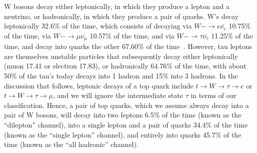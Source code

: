 W bosons decay either leptonically, in which they produce a lepton and a neutrino, or hadronically, in which they produce a pair of quarks.
W's decay leptonically 32.6\% of the time, which consists of decaying via $W- \rightarrow e \bar{\nu_{e}}$ 10.75\% of the time, 
via $W- \rightarrow \mu \bar{\nu_{\mu}}$ 10.57\% of the time, and via $W- \rightarrow \tau \bar{\nu_{\tau}}$ 11.25\% of the time, 
and decay into quarks the other 67.60\% of the time~\cite{PARTICLE_DATA_GROUP}.
However, tau leptons are themselves unstable particles that subsequently decay either leptonically (muon 17.41 or electron 17.83), or hadronically 64.76\% of the time, with about 50\% of the tau's today decays into 1 hadron and 15\% into 3 hadrons.
In the discussion that follows, leptonic decays of a top quark include $t \rightarrow W \rightarrow \tau \rightarrow e$ or $t \rightarrow W \rightarrow \tau \rightarrow \mu$, and we will ignore the intermediate state $\tau$ in terms of our classification.
Hence, a pair of top quarks, which we assume always decay into a pair of W bosons, will decay into two leptons 6.5\% of the time (known as the ``dilepton'' channel), into a single lepton and a pair of quarks 34.4\% of the time (known as the ``single lepton'' channel), and entirely into quarks 45.7\% of the time (known as the ``all hadronic'' channel).





